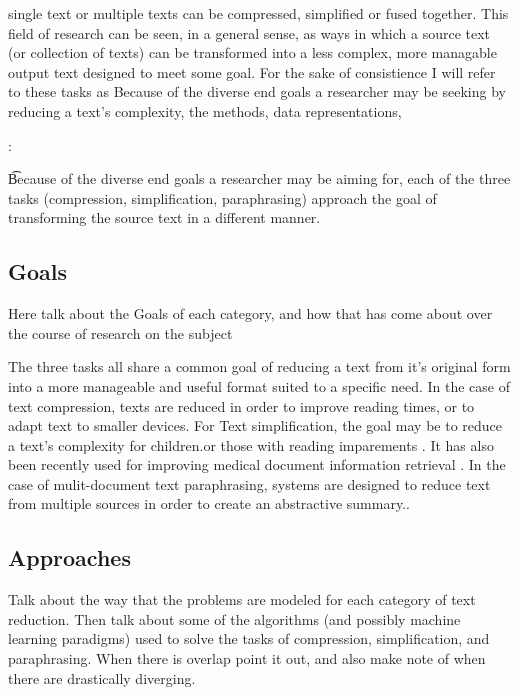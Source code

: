 {single text or multiple texts can be compressed, simplified or fused together.  This field of research can be seen, in a general sense, as ways in which a source text (or collection of texts) can be transformed into a less complex, more managable output text designed to meet some goal.  For the sake of consistience I will refer to these tasks as  Because of the diverse end goals a researcher may be seeking by reducing a text's complexity, the methods, data representations,} 





 :

\t{Because of the diverse end goals a researcher may be aiming for, each of the three tasks (compression, simplification, paraphrasing) approach the goal of transforming the source text in a different manner. 
}







\subsection{Goals}
{Here talk about the Goals of each category, and how that has come about over the course of research on the subject}

 {The three tasks all share a common goal of reducing a text from it's original form into a more manageable and useful format suited to a specific need.   In the case of text compression, texts are reduced in order to improve reading times,\citet{bla} or to adapt text to smaller devices\citet{bla}. For Text simplification, the goal may be to reduce a text's complexity for children\citet{bla}.or those with reading imparements \citet{bla}.  It has also been recently used for improving medical document information retrieval \citet{bla}. In the case of mulit-document text paraphrasing,  systems are  designed to reduce text from multiple sources in order to create an abstractive summary.\citet{bla}.}

\subsection{Approaches}
{Talk about the way that the problems are modeled for each category of text reduction. Then talk about some of the algorithms (and possibly machine learning paradigms) used to solve the tasks of compression, simplification, and paraphrasing.  When there is overlap point it out, and also make note of when there are drastically diverging. }


